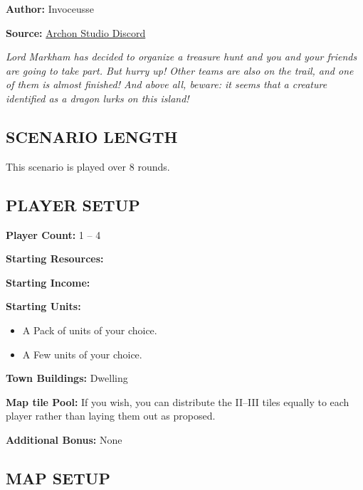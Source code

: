 
\begin{multicols*}{2}

\textbf{Author:} Invoceusse

\textbf{Source:} \href{https://discord.com/channels/740870068178649108/1222679455261261986}{Archon Studio Discord}

\textit{Lord Markham has decided to organize a treasure hunt and you and your friends are going to take part.
  But hurry up! Other teams are also on the trail, and one of them is almost finished!
  And above all, beware: it seems that a creature identified as a dragon lurks on this island!}
\subsection*{\MakeUppercase{Scenario Length}}

This scenario is played over 8 rounds.

\subsection*{\MakeUppercase{Player setup}}

\textbf{Player Count:} 1 -- 4

\textbf{Starting Resources:}\par
{}

\textbf{Starting Income:}\par
{}

\textbf{Starting Units:}
\begin{itemize}
  \item A Pack of  units of your choice.
  \item A Few  units of your choice.
\end{itemize}

\textbf{Town Buildings:}  Dwelling

\textbf{Map tile Pool:} If you wish, you can distribute the II--III tiles equally to each player rather than laying them out as proposed.

\textbf{Additional Bonus:} None

\subsection*{\MakeUppercase{Map Setup}}


\end{multicols*}
